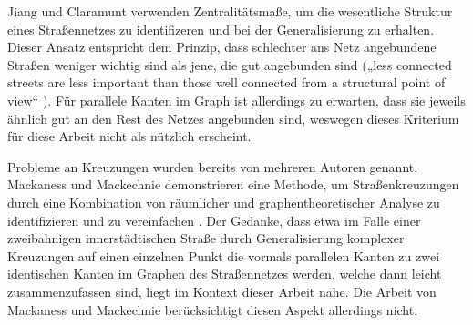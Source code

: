 \documentclass[../main/thesis.tex]{subfiles}
\begin{document}
Jiang und Claramunt verwenden Zentralitätsmaße, um die wesentliche Struktur eines Straßennetzes zu identifizeren und bei der Generalisierung zu erhalten. Dieser Ansatz entspricht dem Prinzip, dass schlechter ans Netz angebundene Straßen weniger wichtig sind als jene, die gut angebunden sind („less connected streets are less important than those well connected from a structural point of view“ ).  Für parallele Kanten im Graph ist allerdings zu erwarten, dass sie jeweils ähnlich gut an den Rest des Netzes angebunden sind, weswegen dieses Kriterium für diese Arbeit nicht als nützlich erscheint.


Probleme an Kreuzungen wurden bereits von mehreren Autoren genannt. Mackaness und Mackechnie demonstrieren eine Methode, um Straßenkreuzungen durch eine Kombination von räumlicher und graphentheoretischer Analyse zu identifizieren und zu vereinfachen . Der Gedanke, dass etwa im Falle einer zweibahnigen innerstädtischen Straße durch Generalisierung komplexer Kreuzungen auf einen einzelnen Punkt die vormals parallelen Kanten zu zwei identischen Kanten im Graphen des Straßennetzes werden, welche dann leicht zusammenzufassen sind, liegt im Kontext dieser Arbeit nahe. Die Arbeit von Mackaness und Mackechnie berücksichtigt diesen Aspekt allerdings nicht.







\onlyinsubfile{\listoffigures} %
\onlyinsubfile{ {}}
\end{document}
